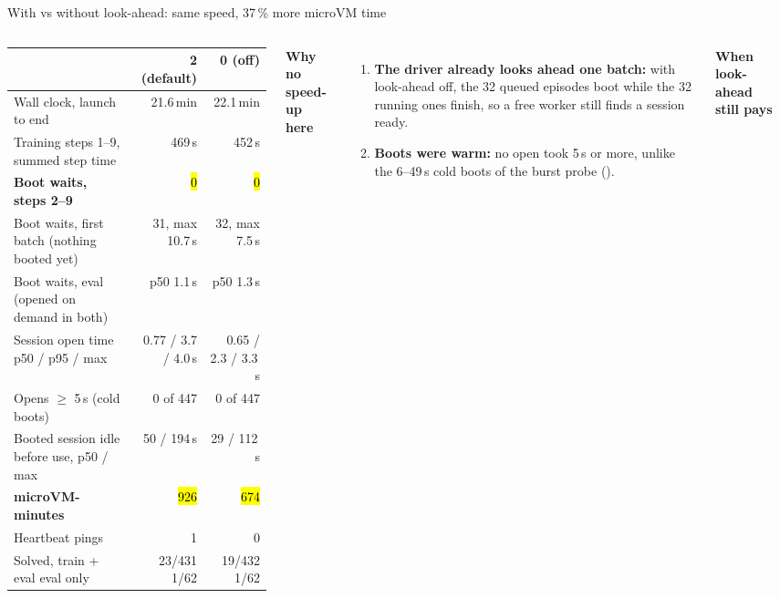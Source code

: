 \begin{frame}{With vs without look-ahead: same speed, 37\,\% more microVM time}
\begin{columns}[T]
\tiny\setlength{\tabcolsep}{3pt}
\begin{tabularx}{\linewidth}{@{}Yrr@{}}
\toprule
& \textbf{2 (default)} & \textbf{0 (off)}\\
\midrule
Wall clock, launch to end & 21.6\,min & 22.1\,min\\
Training steps 1--9, summed step time & 469\,s & 452\,s\\
\textbf{Boot waits, steps 2--9} & \hl{0} & \hl{0}\\
Boot waits, first batch (nothing booted yet) & 31, max 10.7\,s & 32, max 7.5\,s\\
Boot waits, eval (opened on demand in both) & p50 1.1\,s & p50 1.3\,s\\
Session open time p50 / p95 / max & 0.77 / 3.7 / 4.0\,s & 0.65 / 2.3 / 3.3\,s\\
Opens $\ge$ 5\,s (cold boots) & 0 of 447 & 0 of 447\\
Booted session idle before use, p50 / max & 50 / 194\,s & 29 / 112\,s\\
\textbf{microVM-minutes} & \hl{926} & \hl{674}\\
Heartbeat pings & 1 & 0\\
Solved, train + eval \textperiodcentered{} eval only & 23/431 \textperiodcentered{} 1/62 & 19/432 \textperiodcentered{} 1/62\\
\bottomrule
\end{tabularx}
\textbf{\footnotesize Why no speed-up here}
\begin{enumerate}\scriptsize\setlength{\itemsep}{0.6mm}
\item \textbf{The driver already looks ahead one batch:} with look-ahead off, the 32 queued episodes boot while the 32 running ones finish, so a free worker still finds a session ready.
\item \textbf{Boots were warm:} no open took 5\,s or more, unlike the 6--49\,s cold boots of the burst probe ().
\end{enumerate}
\vspace{1mm}
\textbf{\footnotesize When look-ahead still pays}
\begin{itemize}\scriptsize\setlength{\itemsep}{0.6mm}

\end{itemize}
\end{columns}
\end{frame}
